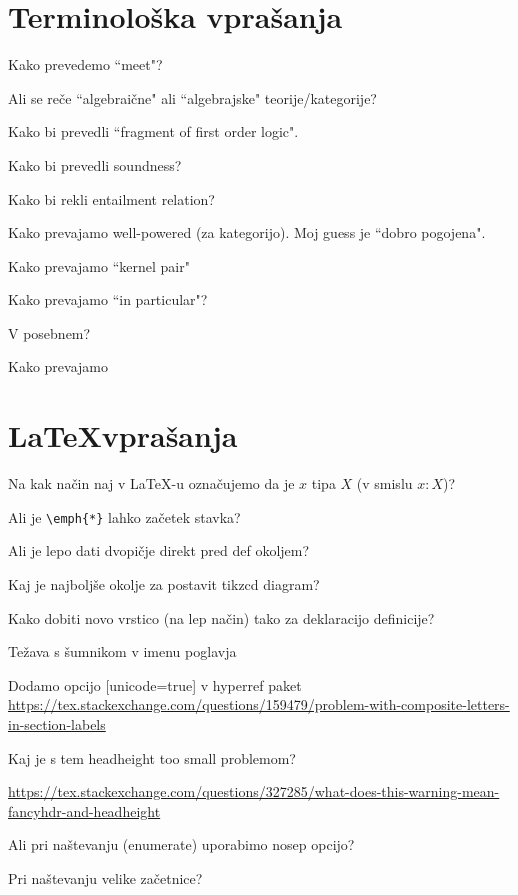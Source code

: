 \documentclass[12pt,a4paper]{article}
\newcommand\ans{\item[\textbf{A:}]}
\begin{document}
    \section*{Terminološka vprašanja}
    \begin{vprasanja}
        \item Kako prevedemo ``meet"?
        \ans
        \item Ali se reče ``algebraične" ali ``algebrajske" teorije/kategorije?
        \ans
        \item Kako bi prevedli ``fragment of first order logic".
        \ans
        \item Kako bi prevedli soundness?
        \ans
        \item Kako bi rekli entailment relation?
        \ans
        \item Kako prevajamo well-powered (za kategorijo). Moj guess je ``dobro pogojena".
        \ans
        \item Kako prevajamo ``kernel pair"
        \ans
        \item Kako prevajamo ``in particular"?
        \ans V posebnem?
        \item Kako prevajamo 
    \end{vprasanja}

    \section*{\LaTeX vprašanja}
    \begin{vprasanja}
        \item Na kak način naj v \LaTeX -u označujemo da je $x$ tipa $X$ (v smislu $x:X$)?
        \ans
        \item Ali je \verb|\emph{*}| lahko začetek stavka?
        \ans
        \item Ali je lepo dati dvopičje direkt pred def okoljem?
        \ans
        \item Kaj je najboljše okolje za postavit tikzcd diagram?
        \ans
        \item Kako dobiti novo vrstico (na lep način) tako za deklaracijo definicije?
        \ans 
        \item Težava s šumnikom v imenu poglavja
        \ans Dodamo opcijo [unicode=true] v hyperref paket
        \url{https://tex.stackexchange.com/questions/159479/problem-with-composite-letters-in-section-labels}
        \item Kaj je s tem headheight too small problemom?
        \ans \url{https://tex.stackexchange.com/questions/327285/what-does-this-warning-mean-fancyhdr-and-headheight}
        \item Ali pri naštevanju (enumerate) uporabimo nosep opcijo?
        \ans
        \item Pri naštevanju velike začetnice?
        \ans
    \end{vprasanja}
\end{document}
